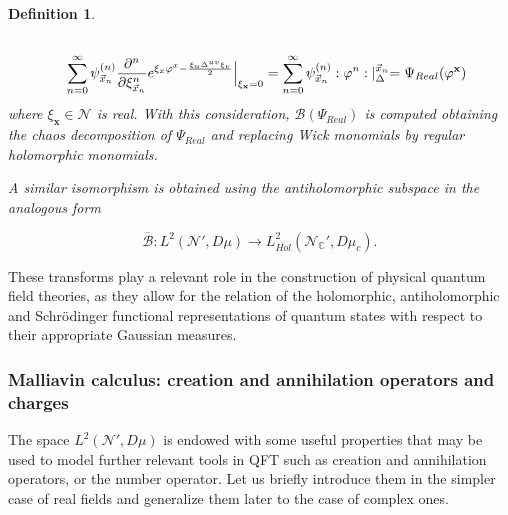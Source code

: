 \documentclass[12pt]{article}%
\newtheorem{definition}{Definition}%
\begin{document}
\begin{definition}
\begin{equation*}
\begin{split}
        \\
        \hspace{ 2 em}\sum_{n=0}^\infty \psi^{(n)}_{\vec{x}_n}\frac{\partial^n}{\partial \xi^n_{\vec{x}_n}}e^{\xi_x\varphi^x-\frac{\xi_u\Delta^{uv}\xi_v}{2}}\Big\lvert_{\xi_\mathbf{x}=0}&=
        \sum_{n=0}^\infty \psi^{(n)}_{\vec{x}_n}:\varphi^n:\lvert_{{\Delta}}^{\vec{x}_n}=
         \Psi_{Real}(\varphi^{\mathbf{x}})
        \end{split}
    \end{equation*}
    where $\xi_\mathbf{x}\in \mathcal{N}$ is real.   With this consideration,  $\mathcal{B}(\Psi_{Real})$ is computed obtaining the chaos decomposition of  $\Psi_{Real}$ and replacing Wick monomials by regular holomorphic monomials. 
    
    A similar isomorphism is obtained using the antiholomorphic subspace in the analogous form
    
    $$
    \overline{\mathcal{B}} :L^2(\mathcal{N}',D\mu)   \longrightarrow  L_{\overline{Hol}}^2(\mathcal{N}_{\mathbb{C}}',D\mu_c).
    $$
\end{definition}


These transforms play a relevant role in the construction of physical quantum field theories, as they allow for the relation of the holomorphic, antiholomorphic and Schr\"odinger functional representations of quantum states with respect to their appropriate Gaussian measures.




\subsubsection{Malliavin calculus: creation and annihilation operators and charges}
\label{sssec:MaliiavinCalculus}
The space $L^2(\mathcal{N}',D\mu)$ is endowed with some useful properties that may be used to model further relevant tools in QFT such as creation and annihilation operators, or the number operator. Let us briefly introduce them in the simpler case of real fields and  generalize them later to the case of complex ones.
\end{document}
